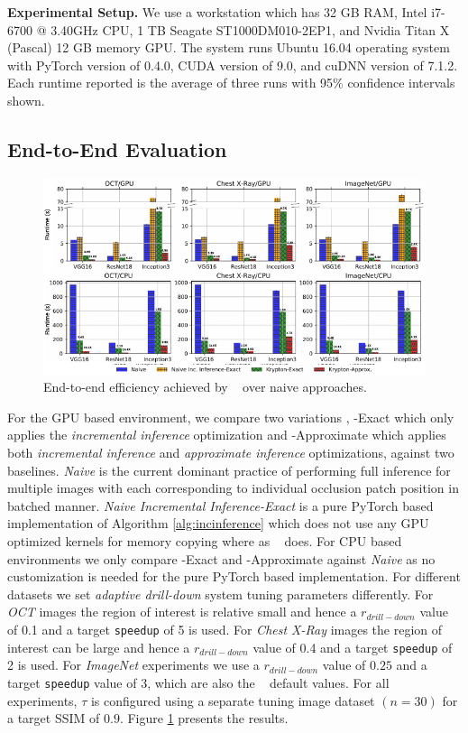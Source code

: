 \vspace{2mm}
\noindent \textbf{Experimental Setup.}
We use a workstation which has 32 GB RAM, Intel i7-6700 @ 3.40GHz CPU, 1 TB Seagate ST1000DM010-2EP1, and Nvidia Titan X (Pascal) 12 GB memory GPU.
The system runs Ubuntu 16.04 operating system with PyTorch version of 0.4.0, CUDA version of 9.0, and cuDNN version of 7.1.2.
Each runtime reported is the average of three runs with 95\% confidence intervals shown.

\subsection{End-to-End Evaluation}

\begin{figure}[t]
\includegraphics[width=\textwidth]{images/5_1_all_edited}
\caption{End-to-end efficiency achieved by \system~ over naive approaches.}
\label{fig:5_1_all_edited}
\end{figure}

For the GPU based environment, we compare two variations \system, \system-Exact which only applies the \textit{incremental inference} optimization and \system-Approximate which applies both \textit{incremental inference} and \textit{approximate inference} optimizations, against two baselines.
\textit{Naive} is the current dominant practice of performing full inference for multiple images with each corresponding to individual occlusion patch position in batched manner.
\textit{Naive Incremental Inference-Exact} is a pure PyTorch based implementation of Algorithm \ref{alg:incinference} which does not use any GPU optimized kernels for memory copying where as \system~ does.
For CPU based environments we only compare \system-Exact and \system-Approximate against \textit{Naive} as no customization is needed for the pure PyTorch based implementation.
For different datasets we set \textit{adaptive drill-down} system tuning parameters differently.
For \textit{OCT} images the region of interest is relative small and hence a $r_{drill-down}$ value of 0.1 and a target \texttt{speedup} of 5 is used.
For \textit{Chest X-Ray} images the region of interest can be large and hence a $r_{drill-down}$ value of 0.4 and a target \texttt{speedup} of 2 is used.
For \textit{ImageNet} experiments we use a $r_{drill-down}$ value of $0.25$ and a target \texttt{speedup} value of 3, which are also the \system~ default values.
For all experiments, $\tau$ is configured using a separate tuning image dataset $(n=30)$ for a target SSIM of $0.9$.
Figure \ref{fig:5_1_all_edited} presents the results.


